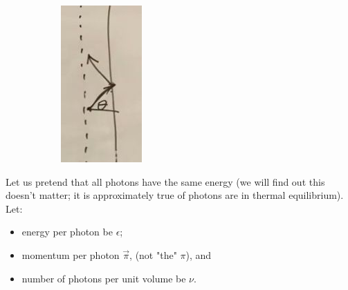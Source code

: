 \documentclass[]{article}
\begin{document}
\begin{figure}[H]
\begin{subfigure}[t]{0.4\textwidth}
		\includegraphics[width=\textwidth]{cosmo-5-wall}
	\end{subfigure}
\end{figure}


Let us pretend that all photons have the same energy (we will find out this doesn't matter; it is approximately true of photons are in thermal equilibrium). Let:
\begin{itemize}
	\item energy per photon be $\epsilon$;
	\item  momentum per photon $\vec{\pi}$, (not "the" $\pi$), and 
	\item number of photons per unit volume be $\nu$.
\end{itemize}
\end{document}
